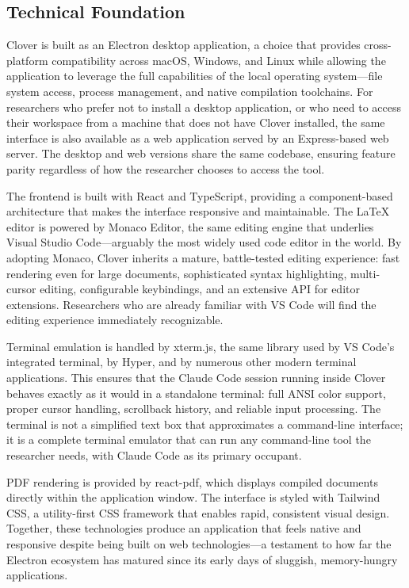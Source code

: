 \documentclass[a4paper,11pt]{article}
\begin{document}
\subsection{Technical Foundation}

Clover is built as an Electron desktop application, a choice that provides cross-platform compatibility across macOS, Windows, and Linux while allowing the application to leverage the full capabilities of the local operating system---file system access, process management, and native compilation toolchains. For researchers who prefer not to install a desktop application, or who need to access their workspace from a machine that does not have Clover installed, the same interface is also available as a web application served by an Express-based web server. The desktop and web versions share the same codebase, ensuring feature parity regardless of how the researcher chooses to access the tool.

The frontend is built with React and TypeScript, providing a component-based architecture that makes the interface responsive and maintainable. The \LaTeX{} editor is powered by Monaco Editor, the same editing engine that underlies Visual Studio Code---arguably the most widely used code editor in the world. By adopting Monaco, Clover inherits a mature, battle-tested editing experience: fast rendering even for large documents, sophisticated syntax highlighting, multi-cursor editing, configurable keybindings, and an extensive API for editor extensions. Researchers who are already familiar with VS Code will find the editing experience immediately recognizable.

Terminal emulation is handled by xterm.js, the same library used by VS Code's integrated terminal, by Hyper, and by numerous other modern terminal applications. This ensures that the Claude Code session running inside Clover behaves exactly as it would in a standalone terminal: full ANSI color support, proper cursor handling, scrollback history, and reliable input processing. The terminal is not a simplified text box that approximates a command-line interface; it is a complete terminal emulator that can run any command-line tool the researcher needs, with Claude Code as its primary occupant.

PDF rendering is provided by react-pdf, which displays compiled documents directly within the application window. The interface is styled with Tailwind CSS, a utility-first CSS framework that enables rapid, consistent visual design. Together, these technologies produce an application that feels native and responsive despite being built on web technologies---a testament to how far the Electron ecosystem has matured since its early days of sluggish, memory-hungry applications.
\end{document}
